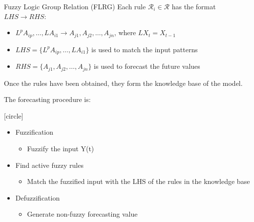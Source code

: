 \documentclass[13pt]{beamer}
\begin{document}
	\begin{frame}{Fuzzy Logic Group Relation (FLRG)}
		Each rule $\mathcal{R}_i \in \mathcal{R}$ has the format $LHS \rightarrow RHS$:
		
		\begin{itemize}
			\item $L^p A_{ip}, \dots, L A_{i1} \rightarrow A_{j1}, A_{j2}, \dots, A_{jn}$, where $L X_t = X_{t-1}$
			\item $LHS = \{L^p A_{ip}, \dots, L A_{i1}\}$ is used to match the input patterns
			\item $RHS = \{A_{j1}, A_{j2}, \dots, A_{jn}\}$ is used to forecast the future values
		\end{itemize}
	\end{frame}
	
	\begin{frame}
		Once the rules have been obtained, they form the knowledge base of the model. \newline
		
		The forecasting procedure is:
		
		[circle] 
		
		\vspace{0.5em} %
		
		\begin{itemize}
			\setlength{\itemsep}{1.2em} %
			
			\item Fuzzification
			\begin{itemize}
				\item Fuzzify the input Y(t)
			\end{itemize}
			
			\item Find active fuzzy rules
			\begin{itemize}
				\item Match the fuzzified input with the LHS of the rules in the knowledge base
			\end{itemize}
			
			\item Defuzzification
			\begin{itemize}
				\item Generate non-fuzzy forecasting value
			\end{itemize}
		\end{itemize}
		
		
		
	\end{frame}
	
\end{document}
